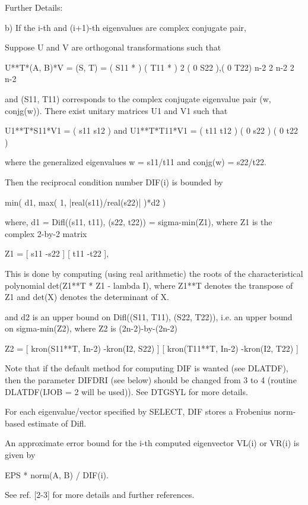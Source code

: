 \begin{DoxyParagraph}{Further Details\+: }
\begin{DoxyVerb}
  b) If the i-th and (i+1)-th eigenvalues are complex conjugate pair,

     Suppose U and V are orthogonal transformations such that

              U**T*(A, B)*V = (S, T) = ( S11  *   ) ( T11  *  )  2
                                       ( 0    S22 ),( 0    T22) n-2
                                         2    n-2     2    n-2

     and (S11, T11) corresponds to the complex conjugate eigenvalue
     pair (w, conjg(w)). There exist unitary matrices U1 and V1 such
     that

       U1**T*S11*V1 = ( s11 s12 ) and U1**T*T11*V1 = ( t11 t12 )
                      (  0  s22 )                    (  0  t22 )

     where the generalized eigenvalues w = s11/t11 and
     conjg(w) = s22/t22.

     Then the reciprocal condition number DIF(i) is bounded by

         min( d1, max( 1, |real(s11)/real(s22)| )*d2 )

     where, d1 = Difl((s11, t11), (s22, t22)) = sigma-min(Z1), where
     Z1 is the complex 2-by-2 matrix

              Z1 =  [ s11  -s22 ]
                    [ t11  -t22 ],

     This is done by computing (using real arithmetic) the
     roots of the characteristical polynomial det(Z1**T * Z1 - lambda I),
     where Z1**T denotes the transpose of Z1 and det(X) denotes
     the determinant of X.

     and d2 is an upper bound on Difl((S11, T11), (S22, T22)), i.e. an
     upper bound on sigma-min(Z2), where Z2 is (2n-2)-by-(2n-2)

              Z2 = [ kron(S11**T, In-2)  -kron(I2, S22) ]
                   [ kron(T11**T, In-2)  -kron(I2, T22) ]

     Note that if the default method for computing DIF is wanted (see
     DLATDF), then the parameter DIFDRI (see below) should be changed
     from 3 to 4 (routine DLATDF(IJOB = 2 will be used)). See DTGSYL
     for more details.

  For each eigenvalue/vector specified by SELECT, DIF stores a
  Frobenius norm-based estimate of Difl.

  An approximate error bound for the i-th computed eigenvector VL(i) or
  VR(i) is given by

             EPS * norm(A, B) / DIF(i).

  See ref. [2-3] for more details and further references.\end{DoxyVerb}
 
\end{DoxyParagraph}
